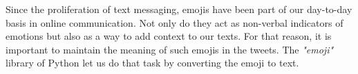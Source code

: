 
Since the proliferation of text messaging, emojis have been part of our day-to-day basis in online communication. Not only do they act as non-verbal indicators of emotions but also as a way to add context to our texts. For that reason, it is important to maintain the meaning of such emojis in the tweets. The \textit{"emoji"} library of Python let us do that task by converting the emoji to text.
